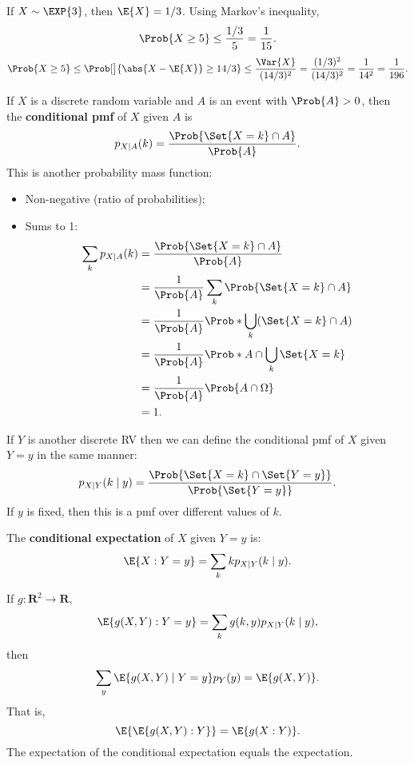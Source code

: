 \begin{Example}{}{}
    If $ X \sim \EXP{3} $, then $ \E{X}=1/3 $. Using Markov's inequality,
    \[ \Prob{X\ge 5}\le \frac{1/3}{5}=\frac{1}{15}. \]
    \[ \Prob{X\ge 5}\le \Prob[\big]{\abs{X-\E{X}}\ge 14/3}\le \frac{\Var{X}}{(14/3)^2}=\frac{(1/3)^2}{(14/3)^2}=\frac{1}{14^2}=\frac{1}{196}. \]
\end{Example}
\begin{Definition}{}{}
    If $ X $ is a discrete random variable and $ A $ is an event
    with $ \Prob{A}>0 $, then the \textbf{conditional pmf} of $ X $ given $ A $ is
    \[ p_{X\mid A}(k)=\frac{\Prob{\Set{X=k}\cap A}}{\Prob{A}}. \]
    This is another probability mass function:
    \begin{itemize}
        \item Non-negative (ratio of probabilities);
        \item Sums to 1:
              \begin{align*}
                  \sum_k p_{X\mid A}(k)
                   & =\frac{\Prob{\Set{X=k}\cap A}}{\Prob{A}}               \\
                   & =\frac{1}{\Prob{A}}\sum_k\Prob{\Set{X=k}\cap A}        \\
                   & =\frac{1}{\Prob{A}}\Prob*{\bigcup_k (\Set{X=k}\cap A)} \\
                   & =\frac{1}{\Prob{A}}\Prob*{A\cap \bigcup_k\Set{X=k} }   \\
                   & =\frac{1}{\Prob{A}}\Prob{A\cap \Omega}                 \\
                   & =1.
              \end{align*}
    \end{itemize}
\end{Definition}
\begin{Definition}{}{}
    If $ Y $ is another discrete RV then we can define the conditional pmf of $ X $
    given $ Y=y $ in the same manner:
    \[ p_{X\mid Y}(k\mid y)=\frac{\Prob{\Set{X=k}\cap\Set{Y=y}}}{\Prob{\Set{Y=y}}}. \]
    If $ y $ is fixed, then this is a pmf over different values of $ k $.
\end{Definition}
\begin{Definition}{}{}
    The \textbf{conditional expectation} of $ X $ given $ Y=y $ is:
    \[ \E{X\given Y=y}=\sum_k k p_{X\mid Y}(k\mid y). \]
\end{Definition}
\begin{Theorem}{}{}
    If $ g\colon \mathbf{R}^2\to\mathbf{R} $,
    \[ \E{g(X,Y)\given Y=y}=\sum_k g(k,y)p_{X\mid Y}(k\mid y), \]
    then
    \[ \sum_y \E{g(X,Y)\mid Y=y}p_Y(y)=\E{g(X,Y)}. \]
    That is,
    \[ \E{\E{g(X,Y)\given Y}}=\E{g(X\given Y)}. \]
    The expectation of the conditional expectation equals the expectation.
\end{Theorem}
